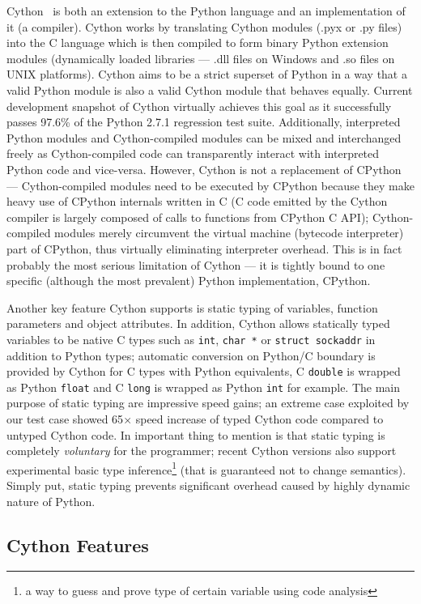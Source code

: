Cython~\cite{BehBraCitDalSelSmi:11} is both an extension to the Python language and an implementation
of it (a compiler). Cython works by translating Cython modules (.pyx or .py files) into the C language which is
then compiled to form binary Python extension modules (dynamically loaded libraries --- .dll files
on Windows and .so files on UNIX platforms). Cython aims to be a strict superset of Python in a way
that a valid Python module is also a valid Cython module that behaves equally. Current development
snapshot of Cython virtually achieves this goal as it successfully passes 97.6\% of the Python 2.7.1
regression test suite. Additionally, interpreted Python modules and Cython-compiled modules can be
mixed and interchanged freely as Cython-compiled code can transparently interact with interpreted
Python code and vice-versa. However, Cython is not a replacement of CPython --- Cython-compiled
modules need to be executed by CPython because they make heavy use of CPython internals written in C
(C code emitted by the Cython compiler is largely composed of calls to functions from CPython C API);
Cython-compiled modules merely circumvent the virtual machine (bytecode interpreter) part of CPython,
thus virtually eliminating interpreter overhead. This is in fact probably the most serious
limitation of Cython --- it is tightly bound to one specific (although the most prevalent) Python
implementation, CPython.

Another key feature Cython supports is static typing of variables, function parameters and object
attributes. In addition, Cython allows statically typed variables to be native C types such as
\verb|int|, \verb|char *| or \verb|struct sockaddr| in addition to Python types; automatic
conversion on Python/C boundary is provided by Cython for C types with Python equivalents, C
\verb|double| is wrapped as Python \verb|float| and C \verb|long| is wrapped as Python
\verb|int| for example. The main purpose of static typing are impressive speed gains; an extreme
case exploited by our test case showed 65\(\times\) speed increase of typed Cython code compared
to untyped Cython code. In important thing to mention is that static typing is completely
\emph{voluntary} for the programmer; recent Cython versions also support experimental basic type
inference\footnote{a way to guess and prove type of certain variable using code analysis} (that
is guaranteed not to change semantics). Simply put, static typing prevents significant overhead
caused by highly dynamic nature of Python.

\subsection{Cython Features}

